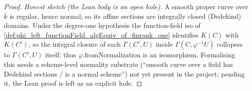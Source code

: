 \begin{proof}
  \emph{Honest sketch (the Lean body is an open hole).} A smooth proper curve
  over \(\bar k\) is regular, hence normal, so its affine sections are integrally
  closed (Dedekind) domains. Under the degree-one hypothesis the function-field
  iso of \cref{def:phi_left_functionField_algEquiv_of_finrank_one} identifies
  \(K(C)\) with \(K(C')\), so the integral closure of each \(\Gamma(C', U)\)
  inside \(\Gamma(C, \varphi^{-1}U)\) collapses to \(\Gamma(C', U)\) itself; thus
  \(\varphi.\mathrm{fromNormalization}\) is an isomorphism. Formalising this needs
  a scheme-level normality substrate (``smooth curve over a field has Dedekind
  sections / is a normal scheme'') not yet present in the project; pending it,
  the Lean proof is left as an explicit hole.
\end{proof}
